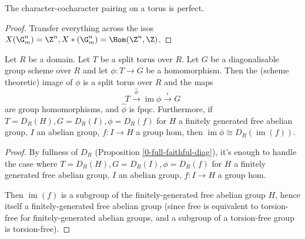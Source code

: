 \begin{proposition}
  \label{0-char-cochar-pairing-perfect}
  \leanok

  The character-cocharacter pairing on a torus is perfect.
\end{proposition}
\begin{proof}
  \uses{}
  \leanok

  Transfer everything across the isos $X(\G_m^n) = \Z^n, X*(\G_m^n) = \Hom(\Z^n, \Z)$.
\end{proof}


\begin{proposition}
  \label{1-1-1-group-hom-torus} %

  Let $R$ be a domain. Let $T$ be a split torus over $R$.
  Let $G$ be a diagonalisable group scheme over $R$ and let $\phi: T \to G$ be a homomorphism.
  Then the (scheme theoretic) image of $\phi$ is a split torus over $R$ and the maps
  \[
    T \xrightarrow{\hat{\phi}} \operatorname{im}\phi \xrightarrow{\iota} G
  \]
  are group homomorphisms, and $\hat{\phi}$ is fpqc.
  Furthermore, if $T = D_R(H), G = D_R(I), \phi = D_R(f)$
  for $H$ a finitely generated free abelian group, $I$ an abelian group, $f : I \to H$ a group hom,
  then $\operatorname{im} \phi \cong D_R(\operatorname{im}(f))$.
\end{proposition}
\begin{proof}

  By fullness of $D_R$ (Proposition \ref{0-full-faithful-diag}),
  it's enough to handle the case where $T = D_R(H), G = D_R(I), \phi = D_R(f)$
  for $H$ a finitely generated free abelian group, $I$ an abelian group, $f : I \to H$ a group hom.

  Then $\operatorname{im}(f)$ is a subgroup of the finitely-generated free abelian group $H$,
  hence itself a finitely-generated free abelian group
  (since free is equivalent to torsion-free for finitely-generated abelian groups,
  and a subgroup of a torsion-free group is torsion-free).
\end{proof}


